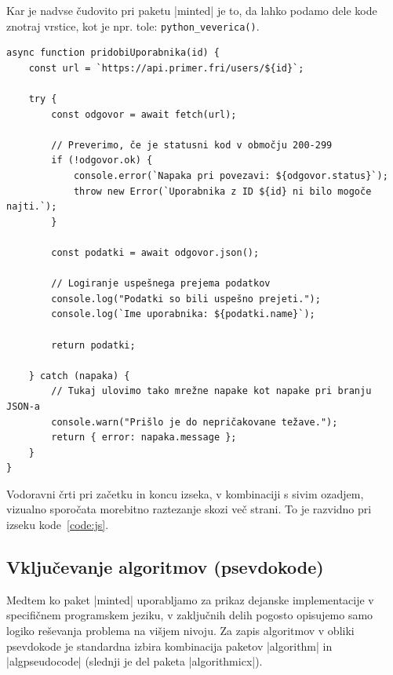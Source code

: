 \documentclass[9pt]{style/friteza}
\begin{document}
Kar je nadvse čudovito pri paketu \ltx|minted| je to, da lahko podamo dele kode znotraj vrstice, kot je npr. tole: \texttt{python_veverica()}.

\begin{center}
\captionsetup{hypcap=false}
\label{code:js}
\begin{verbatim}
async function pridobiUporabnika(id) {
    const url = `https://api.primer.fri/users/${id}`;
    
    try {
        const odgovor = await fetch(url);
        
        // Preverimo, če je statusni kod v območju 200-299
        if (!odgovor.ok) {
            console.error(`Napaka pri povezavi: ${odgovor.status}`);
            throw new Error(`Uporabnika z ID ${id} ni bilo mogoče najti.`);
        }

        const podatki = await odgovor.json();
        
        // Logiranje uspešnega prejema podatkov
        console.log("Podatki so bili uspešno prejeti.");
        console.log(`Ime uporabnika: ${podatki.name}`);
        
        return podatki;
        
    } catch (napaka) {
        // Tukaj ulovimo tako mrežne napake kot napake pri branju JSON-a
        console.warn("Prišlo je do nepričakovane težave.");
        return { error: napaka.message };
    }
}
\end{verbatim}
\end{center}

Vodoravni črti pri začetku in koncu izseka, v kombinaciji s sivim ozadjem, vizualno sporočata morebitno raztezanje skozi več strani. To je razvidno pri izseku kode~\ref{code:js}.

\subsection{Vključevanje algoritmov (psevdokode)}

Medtem ko paket \ltx|minted| uporabljamo za prikaz dejanske implementacije v specifičnem programskem jeziku, v zaključnih delih pogosto opisujemo samo logiko reševanja problema na višjem nivoju. Za zapis algoritmov v obliki psevdokode je standardna izbira kombinacija paketov \ltx|algorithm| in \ltx|algpseudocode| (slednji je del paketa \ltx|algorithmicx|).
\end{document}
